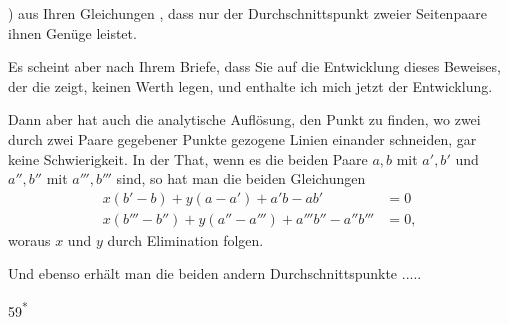 ) aus Ihren Gleichungen , dass nur der Durchschnittspunkt zweier Seitenpaare ihnen Genüge leistet.

\indent Es scheint aber nach Ihrem Briefe, dass Sie auf die Entwicklung dieses Beweises, der die  zeigt, keinen Werth legen, und  enthalte ich mich jetzt der Entwicklung.

\indent Dann aber hat auch die analytische Auflösung, den Punkt zu finden, wo zwei durch zwei Paare gegebener Punkte gezogene Linien einander schneiden, gar keine Schwierigkeit. In der That, wenn es die beiden Paare \(a,b\) mit \(a',b'\) und \(a'',b''\) mit \(a''',b'''\) sind, so hat man die beiden Gleichungen
\[
\begin{aligned}
x(b'-b)+y(a-a')+a'b-ab'&=0\\
x(b'''-b'')+y(a''-a''')+a'''b''-a''b'''&=0,
\end{aligned}
\]
\noindent woraus \(x\) und \(y\) durch Elimination folgen.

\indent Und ebenso erhält man die beiden andern Durchschnittspunkte .\enspace.\enspace.\enspace.\enspace.
\par\vfill\noindent\hfill59\textsuperscript{*}
